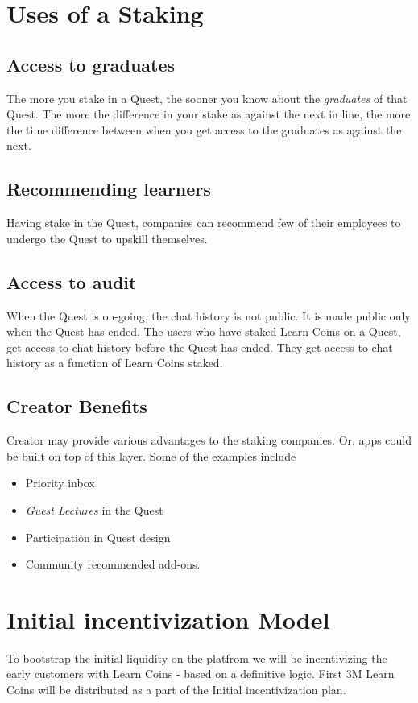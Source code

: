 \documentclass{article}
\begin{document}
  \section{Uses of a Staking}
    \subsection{Access to graduates}
      The more you stake in a Quest, the sooner you know about the \textit{graduates} of that Quest.
      The more the difference in your stake as against the next in line, the more the time difference between when you get access to the graduates as against the next.
    \subsection{Recommending learners}
      Having stake in the Quest, companies can recommend few of their employees to undergo the Quest to upskill themselves.
    \subsection{Access to audit}
      When the Quest is on-going, the chat history is not public. It is made public only when the Quest has ended.
      The users who have staked Learn Coins on a Quest, get access to chat history before the Quest has ended. 
      They get access to chat history as a function of Learn Coins staked.
    \subsection{Creator Benefits}
      Creator may provide various advantages to the staking companies. Or, apps could be built on top of this layer. Some of the examples include 
      \begin{itemize}
        \item Priority inbox
        \item \textit{Guest Lectures} in the Quest
        \item Participation in Quest design 
        \item Community recommended add-ons.
      \end{itemize}

  \section{Initial incentivization Model}
    To bootstrap the initial liquidity on the platfrom we will be incentivizing the early customers with Learn Coins - based on a definitive logic.
    First 3M Learn Coins will be distributed as a part of the Initial incentivization plan.
\end{document}
